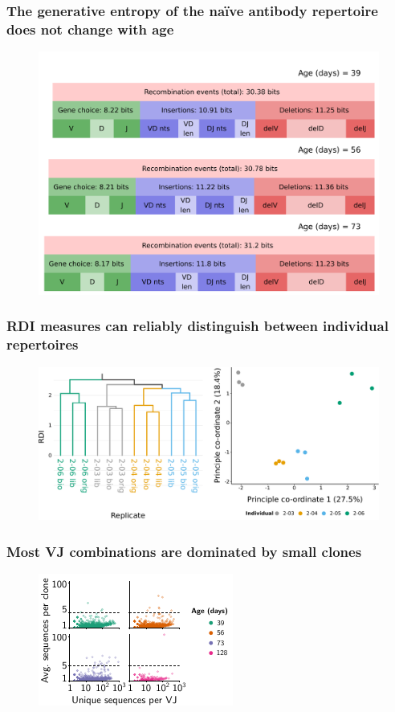 \documentclass[presentation]{beamer}
\newlength{\slideheight}
\begin{document}
\begin{frame}
\frametitle{The generative entropy of the na\"ive antibody repertoire does not change with age}
\begin{figure}
\includegraphics[height=0.95\slideheight]{figs/pdf/extra/ageing-igor-entropies}
\end{figure}
\end{frame}

\begin{frame}
\frametitle{RDI measures can reliably distinguish between individual repertoires}
\begin{figure}
\includegraphics[width=\textwidth]{figs/pdf/extra/pilot-rdi-vj-replicate}
\end{figure}
\end{frame}

\begin{frame}
\frametitle{Most VJ combinations are dominated by small clones}
\begin{figure}
\includegraphics[height=\slideheight]{figs/pdf/vj-clonesizes}
\end{figure}
\end{frame}
\end{document}
